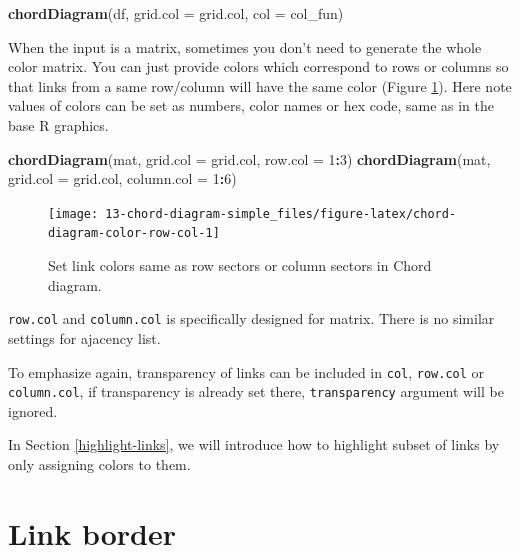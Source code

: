 \documentclass[]{book}
\newenvironment{Shaded}{\begin{snugshade}}{\end{snugshade}}
\newcommand{\KeywordTok}[1]{\textcolor[rgb]{0.13,0.29,0.53}{\textbf{#1}}}
\newcommand{\DataTypeTok}[1]{\textcolor[rgb]{0.13,0.29,0.53}{#1}}
\newcommand{\DecValTok}[1]{\textcolor[rgb]{0.00,0.00,0.81}{#1}}
\newcommand{\OperatorTok}[1]{\textcolor[rgb]{0.81,0.36,0.00}{\textbf{#1}}}
\newcommand{\NormalTok}[1]{#1}
\begin{document}
\begin{Shaded}
\begin{Highlighting}[]
\KeywordTok{chordDiagram}\NormalTok{(df, }\DataTypeTok{grid.col =}\NormalTok{ grid.col, }\DataTypeTok{col =}\NormalTok{ col_fun)}
\end{Highlighting}
\end{Shaded}

When the input is a matrix, sometimes you don't need to generate the
whole color matrix. You can just provide colors which correspond to rows
or columns so that links from a same row/column will have the same color
(Figure \ref{fig:chord-diagram-color-row-col}). Here note values of
colors can be set as numbers, color names or hex code, same as in the
base R graphics.

\begin{Shaded}
\begin{Highlighting}[]
\KeywordTok{chordDiagram}\NormalTok{(mat, }\DataTypeTok{grid.col =}\NormalTok{ grid.col, }\DataTypeTok{row.col =} \DecValTok{1}\OperatorTok{:}\DecValTok{3}\NormalTok{)}
\KeywordTok{chordDiagram}\NormalTok{(mat, }\DataTypeTok{grid.col =}\NormalTok{ grid.col, }\DataTypeTok{column.col =} \DecValTok{1}\OperatorTok{:}\DecValTok{6}\NormalTok{)}
\end{Highlighting}
\end{Shaded}

\begin{figure}

{\centering \texttt{[image: 13-chord-diagram-simple\_files/figure-latex/chord-diagram-color-row-col-1]} 

}

\caption{Set link colors same as row sectors or column sectors in Chord diagram.}\label{fig:chord-diagram-color-row-col}
\end{figure}

\texttt{row.col} and \texttt{column.col} is specifically designed for
matrix. There is no similar settings for ajacency list.

To emphasize again, transparency of links can be included in
\texttt{col}, \texttt{row.col} or \texttt{column.col}, if transparency
is already set there, \texttt{transparency} argument will be ignored.

In Section \ref{highlight-links}, we will introduce how to highlight
subset of links by only assigning colors to them.

\section{Link border}\label{chord-diagram-link-border}
\end{document}
